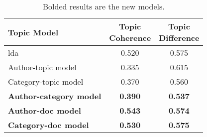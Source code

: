 \begin{table}[h]
	\centering
	\caption{Bolded results are the new models.}
	\begin{tabular}{l|c|c}
		Topic Model & \makecell{Topic \\ Coherence} & \makecell{Topic \\ Difference} \\
		\midrule
		\Acrlong{lda} & 0.520 & 0.575 \\
		Author-topic model & 0.335 & 0.615 \\
		Category-topic model & 0.370 & 0.560 \\
		\textbf{Author-category model} & \textbf{0.390} & \textbf{0.537} \\
		\textbf{Author-doc model} & \textbf{0.543} & \textbf{0.574} \\
		\textbf{Category-doc model} &\textbf{ 0.530} & \textbf{0.575} \\
	\end{tabular}
	\label{tab:_extra_metric_results}
\end{table}

